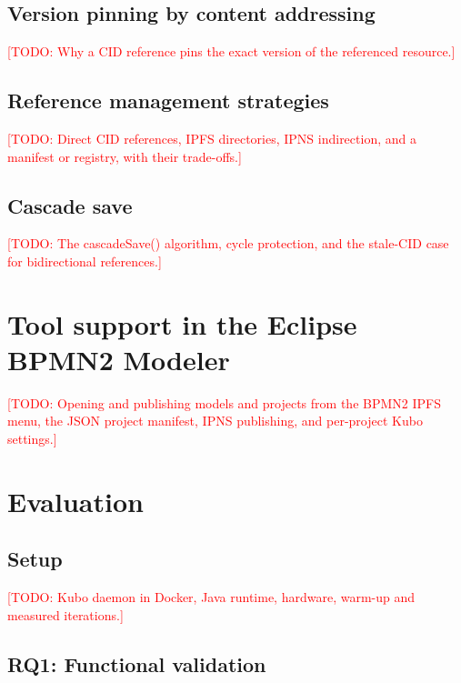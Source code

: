 \documentclass[iicol,pdflatex,sn-mathphys-num]{sn-jnl}
\theoremstyle{thmstylethree}%
\newcommand{\todo}[1]{\textcolor{red}{[TODO: #1]}}
\begin{document}
\subsection{Version pinning by content addressing}\label{sec:rq2-pinning}

\todo{Why a CID reference pins the exact version of the referenced resource.}

\subsection{Reference management strategies}\label{sec:rq2-strategies}

\todo{Direct CID references, IPFS directories, IPNS indirection, and a
manifest or registry, with their trade-offs.}

\subsection{Cascade save}\label{sec:rq2-cascade}

\todo{The cascadeSave() algorithm, cycle protection, and the stale-CID case for
bidirectional references.}

\section{Tool support in the Eclipse BPMN2 Modeler}\label{sec:tool}

\todo{Opening and publishing models and projects from the BPMN2 IPFS menu,
the JSON project manifest, IPNS publishing, and per-project Kubo settings.}

\section{Evaluation}\label{sec:evaluation}

\subsection{Setup}\label{sec:evaluation-setup}

\todo{Kubo daemon in Docker, Java runtime, hardware, warm-up and measured
iterations.}

\subsection{RQ1: Functional validation}\label{sec:evaluation-rq1}
\end{document}
